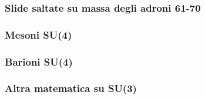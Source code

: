 \subsubsection{Slide saltate su massa degli adroni 61-70}
\subsubsection{Mesoni SU(4)}
\subsubsection{Barioni SU(4)}
\subsubsection{Altra matematica su SU(3)}